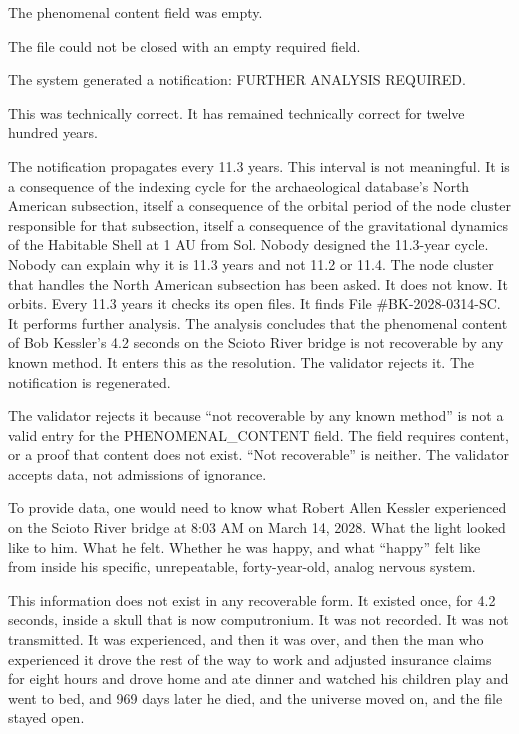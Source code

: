 The phenomenal content field was empty.

The file could not be closed with an empty required field.

The system generated a notification: FURTHER ANALYSIS REQUIRED.

This was technically correct. It has remained technically correct for twelve hundred years.

\bigskip

The notification propagates every 11.3 years. This interval is not meaningful. It is a consequence of the indexing cycle for the archaeological database's North American subsection, itself a consequence of the orbital period of the node cluster responsible for that subsection, itself a consequence of the gravitational dynamics of the Habitable Shell at 1 AU from Sol. Nobody designed the 11.3-year cycle. Nobody can explain why it is 11.3 years and not 11.2 or 11.4. The node cluster that handles the North American subsection has been asked. It does not know. It orbits. Every 11.3 years it checks its open files. It finds File \#BK-2028-0314-SC. It performs further analysis. The analysis concludes that the phenomenal content of Bob Kessler's 4.2 seconds on the Scioto River bridge is not recoverable by any known method. It enters this as the resolution. The validator rejects it. The notification is regenerated.

The validator rejects it because ``not recoverable by any known method'' is not a valid entry for the PHENOMENAL\_CONTENT field. The field requires content, or a proof that content does not exist. ``Not recoverable'' is neither. The validator accepts data, not admissions of ignorance.

To provide data, one would need to know what Robert Allen Kessler experienced on the Scioto River bridge at 8:03 AM on March 14, 2028. What the light looked like to him. What he felt. Whether he was happy, and what ``happy'' felt like from inside his specific, unrepeatable, forty-year-old, analog nervous system.

This information does not exist in any recoverable form. It existed once, for 4.2 seconds, inside a skull that is now computronium. It was not recorded. It was not transmitted. It was experienced, and then it was over, and then the man who experienced it drove the rest of the way to work and adjusted insurance claims for eight hours and drove home and ate dinner and watched his children play and went to bed, and 969 days later he died, and the universe moved on, and the file stayed open.
